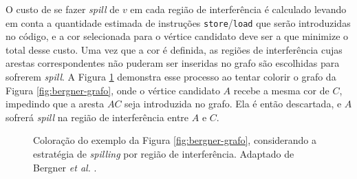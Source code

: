 \documentclass[
	12pt,				%
	openright,			%
	twoside,			%
	a4paper,			%
	tcc,			%
	]{ABNT-DC-UEL}
\begin{document}
O custo de se fazer \textit{spill} de $v$ em cada região de interferência é calculado levando em conta a quantidade estimada de instruções \texttt{store}/\texttt{load} que serão introduzidas no código, e a cor selecionada para o vértice candidato deve ser a que minimize o total desse custo. Uma vez que a cor é definida, as regiões de interferência cujas arestas correspondentes não puderam ser inseridas no grafo são escolhidas para sofrerem \textit{spill}. A Figura \ref{fig:bergner-grafo-col} demonstra esse processo ao tentar colorir o grafo da Figura \ref{fig:bergner-grafo}, onde o vértice candidato $A$ recebe a mesma cor de $C$, impedindo que a aresta $AC$ seja introduzida no grafo. Ela é então descartada, e $A$ sofrerá \textit{spill} na região de interferência entre $A$ e $C$.

\begin{figure}[hbt]
    \centering
    \begin{subfigure}{0.44\textwidth}
        \centering
    \end{subfigure}
    \begin{subfigure}{0.1\textwidth}
        \centering
    \end{subfigure}
    \begin{subfigure}{0.44\textwidth}
        \centering
    \end{subfigure}
    \caption{Coloração do exemplo da Figura \ref{fig:bergner-grafo}, considerando a estratégia de \textit{spilling} por região de interferência. Adaptado de Bergner \textit{et al.} \cite{bergner:97}.}
    \label{fig:bergner-grafo-col}
\end{figure}
\end{document}
